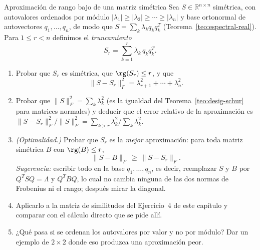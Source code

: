 \begin{entrega}{Aproximación de rango bajo de una matriz simétrica}
\label{ent:rango-bajo}
Sea $S\in\mathbb{R}^{n\times n}$ simétrica, con autovalores ordenados por módulo
$|\lambda_1|\ge|\lambda_2|\ge\cdots\ge|\lambda_n|$ y base ortonormal de autovectores
$q_1,\dots,q_n$, de modo que $S=\sum_{k}\lambda_kq_kq_k^{T}$
(Teorema~\ref{teo:espectral-real}). Para $1\le r<n$ definimos el \emph{truncamiento}
\[
S_r=\sum_{k=1}^{r}\lambda_k\,q_kq_k^{T}.
\]

\begin{enumerate}[label=\textbf{(\alph*)},itemsep=3pt,topsep=4pt]
\item Probar que $S_r$ es simétrica, que $\rg(S_r)\le r$, y que
\[
\|S-S_r\|_F^{2}=\lambda_{r+1}^{2}+\cdots+\lambda_n^{2}.
\]

\item Probar que $\|S\|_F^{2}=\sum_k\lambda_k^{2}$ (es la
igualdad del Teorema~\ref{teo:desig-schur} para matrices normales) y deducir que el
error relativo de la aproximación es
$\|S-S_r\|_F^{2}/\|S\|_F^{2}=\sum_{k>r}\lambda_k^{2}\big/\sum_k\lambda_k^{2}$.

\item \emph{(Optimalidad.)} Probar que $S_r$ es la \emph{mejor} aproximación: para toda
matriz simétrica $B$ con $\rg(B)\le r$,
\[
\|S-B\|_F\ \ge\ \|S-S_r\|_F .
\]
\emph{Sugerencia:} escribir todo en la base $q_1,\dots,q_n$, es decir, reemplazar $S$ y
$B$ por $Q^{T}SQ=\Lambda$ y $Q^{T}BQ$, lo cual no cambia ninguna de las dos normas de
Frobenius ni el rango; después mirar la diagonal.

\item Aplicarlo a la matriz de similitudes del Ejercicio~4 de este capítulo y comparar
con el cálculo directo que se pide allí.

\item ¿Qué pasa si se ordenan los autovalores por valor y no por módulo? Dar un ejemplo
de $2\times2$ donde eso produzca una aproximación peor.

\end{enumerate}

\medskip
{}
\end{entrega}

